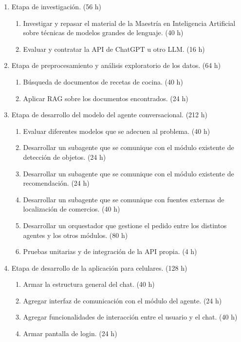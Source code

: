 \documentclass[
11pt, %
]{charter}
\begin{document}
\begin{enumerate}

\item Etapa de investigación. (56 h)
    \begin{enumerate}
        \item Investigar y repasar el material de la Maestría en Inteligencia Artificial sobre técnicas de modelos grandes de lenguaje. (40 h)
        \item Evaluar y contratar la API de ChatGPT u otro LLM. (16 h)
    \end{enumerate}

\item Etapa de preprocesamiento y análisis exploratorio de los datos. (64 h)
    \begin{enumerate}
        \item Búsqueda de documentos de recetas de cocina. (40 h)
        \item Aplicar RAG sobre los documentos encontrados. (24 h)
    \end{enumerate}

\item Etapa de desarrollo del modelo del agente conversacional. (212 h)
    \begin{enumerate}
        \item Evaluar diferentes modelos que se adecuen al problema. (40 h)
        \item Desarrollar un subagente que se comunique con el módulo existente de detección de objetos. (24 h)
        \item Desarrollar un subagente que se comunique con el módulo existente de recomendación. (24 h)
        \item Desarrollar un subagente que se comunique con fuentes externas de localización de comercios. (40 h)
        \item Desarrollar un orquestador que gestione el pedido entre los distintos agentes y los otros módulos. (80 h)
        \item Pruebas unitarias y de integración de la API propia. (4 h)
    \end{enumerate}

\item Etapa de desarrollo de la aplicación para celulares. (128 h)
    \begin{enumerate}
        \item Armar la estructura general del chat. (40 h)
        \item Agregar interfaz de comunicación con el módulo del agente. (24 h)
        \item Agregar funcionalidades de interacción entre el usuario y el chat. (40 h)
        \item Armar pantalla de login. (24 h)
    \end{enumerate}


\end{enumerate}
\end{document}
